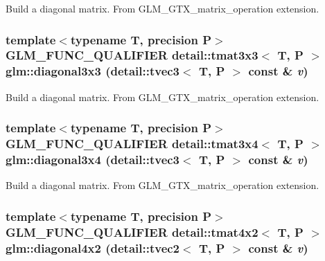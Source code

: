 Build a diagonal matrix. From GLM\_\-GTX\_\-matrix\_\-operation extension. \hypertarget{group__gtx__matrix__operation_g6cc2ba1eff14f0548370fe4df925975c}{
\subsubsection[diagonal3x3]{\setlength{\rightskip}{0pt plus 5cm}template$<$typename T, precision P$>$ GLM\_\-FUNC\_\-QUALIFIER detail::tmat3x3$<$ T, P $>$ glm::diagonal3x3 (detail::tvec3$<$ T, P $>$ const \& {\em v})}}
\label{group__gtx__matrix__operation_g6cc2ba1eff14f0548370fe4df925975c}


Build a diagonal matrix. From GLM\_\-GTX\_\-matrix\_\-operation extension. \hypertarget{group__gtx__matrix__operation_g57adf8191f7e67838ee97d9f366fef16}{
\subsubsection[diagonal3x4]{\setlength{\rightskip}{0pt plus 5cm}template$<$typename T, precision P$>$ GLM\_\-FUNC\_\-QUALIFIER detail::tmat3x4$<$ T, P $>$ glm::diagonal3x4 (detail::tvec3$<$ T, P $>$ const \& {\em v})}}
\label{group__gtx__matrix__operation_g57adf8191f7e67838ee97d9f366fef16}


Build a diagonal matrix. From GLM\_\-GTX\_\-matrix\_\-operation extension. \hypertarget{group__gtx__matrix__operation_ge32f9a70411084d4b33464c23b04c997}{
\subsubsection[diagonal4x2]{\setlength{\rightskip}{0pt plus 5cm}template$<$typename T, precision P$>$ GLM\_\-FUNC\_\-QUALIFIER detail::tmat4x2$<$ T, P $>$ glm::diagonal4x2 (detail::tvec2$<$ T, P $>$ const \& {\em v})}}
\label{group__gtx__matrix__operation_ge32f9a70411084d4b33464c23b04c997}


